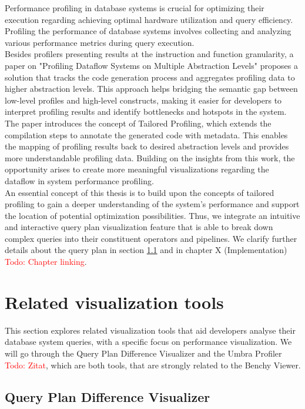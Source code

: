 Performance profiling in database systems is crucial for optimizing their execution regarding achieving optimal hardware utilization and query efficiency.
Profiling the performance of database systems involves collecting and analyzing various performance metrics during query execution.
\\Besides profilers presenting results at the instruction and function granularity, a paper on "Profiling Dataflow Systems on Multiple Abstraction Levels" \cite{profiling-dataflow} proposes a solution that tracks the code generation process and aggregates profiling data to higher abstraction levels. This approach helps bridging the semantic gap between low-level profiles and high-level constructs, making it easier for developers to interpret profiling results and identify bottlenecks and hotspots in the system. The paper introduces the concept of Tailored Profiling, which extends the compilation steps to annotate the generated code with metadata. This enables the mapping of profiling results back to desired abstraction levels and provides more understandable profiling data.
Building on the insights from this work, the opportunity arises to create more meaningful visualizations regarding the dataflow in system performance profiling.
\\ An essential concept of this thesis is to build upon the concepts of tailored profiling to gain a deeper understanding of the system's performance and support the location of potential optimization possibilities. Thus, we integrate an intuitive and interactive query plan visualization feature that is able to break down complex queries into their constituent operators and pipelines. We clarify further details about the query plan in section \ref{subsec:semantic-diff} and in chapter X (Implementation) \textcolor{red}{Todo: Chapter linking}.

\section{Related visualization tools}

This section explores related visualization tools that aid developers analyse their database system queries, with a specific focus on performance visualization. We will go through the Query Plan Difference Visualizer and the Umbra Profiler \textcolor{red}{Todo: Zitat}, which are both tools, that are strongly related to the Benchy Viewer. 


\subsection{Query Plan Difference Visualizer}
\label{subsec:semantic-diff}

